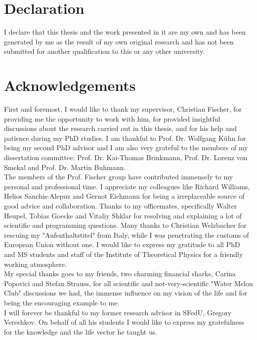 \chapter*{Declaration}
I declare that this thesis and the work presented in it are my own and has been generated by me as the result of my own original research and has not been submitted for another qualification to this or any other university.



\chapter*{Acknowledgements}
First and foremost, I would like to thank my supervisor, Christian Fischer, for providing
me the opportunity to work with him, for provided insightful discussions about the research carried out in this
thesis, and for his help and patience during my PhD studies. I am thankful to Prof. Dr. Wolfgang K{\"u}hn for being my second PhD advisor and I am also very grateful to the members of my dissertation committee: Prof. Dr. Kai-Thomas Brinkmann, Prof. Dr. Lorenz von Smekal and Prof. Dr. Martin Buhmann. \\

The members of the Prof. Fischer group have contributed immensely to my personal and
professional time. I appreciate my colleagues like Richard Williams, Helios Sanchis-Alepuz and Gernot Eichmann for being a irreplaceable source of good advice and collaboration. Thanks to my officemates, specifically Walter Heupel, Tobias Goecke and Vitaliy Shklar for resolving and explaining a lot of scientific and programming questions. Many thanks to Christian Welzbacher for rescuing my "Aufenthaltstitel" from Italy, while I was penetrating the customs of European Union without one. I would like to express my gratitude to all PhD and MS students and staff of the Institute of Theoretical Physics for a friendly working atmosphere. \\

My special thanks goes to my friends, two charming financial sharks, Carina Popovici and Stefan Strauss, for all scientific and not-very-scientific "Water Melon Club" discussions we had, the immense influence on my vision of the life and for being the encouraging example to me. \\

I will forever be thankful to my former research advisor in SFedU, Gregory Vereshkov. On behalf of all his students I would like to express my gratefulness for the knowledge and the life vector he taught us. \\


